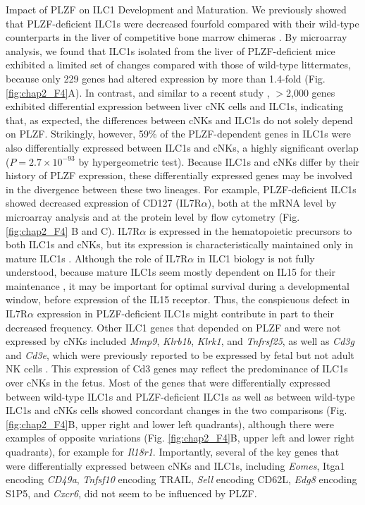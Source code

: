 Impact of PLZF on ILC1 Development and Maturation. We previously showed that PLZF-deficient ILC1s were decreased fourfold compared with their wild-type counterparts in the liver of competitive bone marrow chimeras \cite{constantinides2014}. By microarray analysis, we found that ILC1s isolated from the liver of PLZF-deficient mice exhibited a limited set of changes compared with those of wild-type littermates, because only 229 genes had altered expression by more than 1.4-fold (Fig. \ref{fig:chap2_F4}A). In contrast, and similar to a recent study \cite{peng2013}, $>$2,000 genes exhibited differential expression between liver cNK cells and ILC1s, indicating that, as expected, the differences between cNKs and ILC1s do not solely depend on PLZF. Strikingly, however, 59\% of the PLZF-dependent genes in ILC1s were also differentially expressed between ILC1s and cNKs, a highly significant overlap ($P = 2.7 \times 10^{−93}$ by hypergeometric test). Because ILC1s and cNKs differ by their history of PLZF expression, these differentially expressed genes may be involved in the divergence between these two lineages. For example, PLZF-deficient ILC1s showed decreased expression of CD127 (IL7R$\alpha$), both at the mRNA level by microarray analysis and at the protein level by flow cytometry (Fig. \ref{fig:chap2_F4} B and C). IL7R$\alpha$ is expressed in the hematopoietic precursors to both ILC1s and cNKs, but its expression is characteristically maintained only in mature ILC1s \cite{diefenbach2014}. Although the role of IL7R$\alpha$ in ILC1 biology is not fully understood, because mature ILC1s seem mostly dependent on IL15 for their maintenance \cite{sojka2014}, it may be important for optimal survival during a developmental window, before expression of the IL15 receptor. Thus, the conspicuous defect in IL7R$\alpha$ expression in PLZF-deficient ILC1s might contribute in part to their decreased frequency. Other ILC1 genes that depended on PLZF and were not expressed by cNKs included \textit{Mmp9}, \textit{Klrb1b}, \textit{Klrk1}, and \textit{Tnfrsf25}, as well as \textit{Cd3g} and \textit{Cd3e}, which were previously reported to be expressed by fetal but not adult NK cells \cite{lanier1992}. This expression of Cd3 genes may reflect the predominance of ILC1s over cNKs in the fetus. Most of the genes that were differentially expressed between wild-type ILC1s and PLZF-deficient ILC1s as well as between wild-type ILC1s and cNKs cells showed concordant changes in the two comparisons (Fig. \ref{fig:chap2_F4}B, upper right and lower left quadrants), although there were examples of opposite variations (Fig. \ref{fig:chap2_F4}B, upper left and lower right quadrants), for example for \textit{Il18r1}. Importantly, several of the key genes that were differentially expressed between cNKs and ILC1s, including \textit{Eomes}, Itga1 encoding \textit{CD49a}, \textit{Tnfsf10} encoding TRAIL, \textit{Sell} encoding CD62L, \textit{Edg8} encoding S1P5, and \textit{Cxcr6}, did not seem to be influenced by PLZF.

